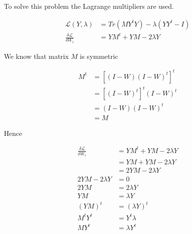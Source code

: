 \documentclass{article}
\begin{document}
    To solve this problem the Lagrange multipliers are used.

    \begin{equation*}
        \begin{aligned}
            \mathcal{L}(Y, \lambda) &= Tr( M Y^t Y) - \lambda (Y Y^t - I)\\
            \frac{\delta \mathcal{L}}{\delta W_i} &= Y M^t + Y M - 2 \lambda Y
        \end{aligned}
    \end{equation*}

    We know that matrix $M$ is symmetric 

    \begin{equation*}
        \begin{aligned}
            M^t &= [(I-W) (I-W)^t]^t\\
                &= [(I-W)^t]^t (I-W)^t\\
                &= (I-W) (I-W)^t\\
                &= M
        \end{aligned}
    \end{equation*}

    Hence

    \begin{equation*}
        \begin{aligned}
            \frac{\delta \mathcal{L}}{\delta W_i} &= Y M^t + Y M - 2 \lambda Y\\
                                                  &= Y M + Y M - 2 \lambda Y\\
                                                  &= 2 Y M - 2 \lambda Y \\
                              2 Y M - 2 \lambda Y &= 0 \\
                                            2 Y M &= 2 \lambda Y \\
                                              Y M &= \lambda Y \\
                                              (Y M)^t &= (\lambda Y)^t \\
                                              M^t Y^t &= Y^t \lambda \\
                                              M Y^t &= \lambda Y^t \\
        \end{aligned}
    \end{equation*}
\end{document}

